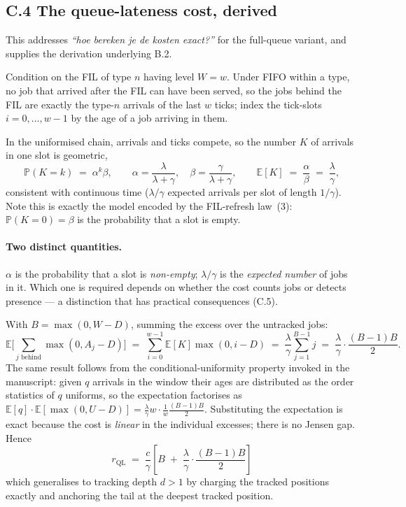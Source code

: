 \documentclass[11pt,a4paper]{article}
\newcommand{\E}{\mathbb{E}}
\newcommand{\Prob}{\mathbb{P}}
\newcommand{\comment}[1]{\textcolor{red!70!black}{\textit{``#1''}}}
\begin{document}
\subsection*{C.4 The queue-lateness cost, derived}

This addresses \comment{hoe bereken je de kosten exact?} for the full-queue
variant, and supplies the derivation underlying B.2.

Condition on the FIL of type $n$ having level $W = w$.  Under FIFO within a
type, no job that arrived after the FIL can have been served, so the jobs behind
the FIL are exactly the type-$n$ arrivals of the last $w$ ticks; index the
tick-slots $i = 0,\dots,w-1$ by the age of a job arriving in them.

In the uniformised chain, arrivals and ticks compete, so the number $K$ of
arrivals in one slot is geometric,
\[
  \Prob(K = k) \;=\; \alpha^k\beta,
  \qquad \alpha = \frac{\lambda}{\lambda+\gamma},
  \quad \beta = \frac{\gamma}{\lambda+\gamma},
  \qquad \E[K] \;=\; \frac{\alpha}{\beta} \;=\; \frac{\lambda}{\gamma},
\]
consistent with continuous time ($\lambda/\gamma$ expected arrivals per slot of
length $1/\gamma$).  Note this is exactly the model encoded by the FIL-refresh
law~(3): $\Prob(K = 0) = \beta$ is the probability that a slot is empty.

\paragraph{Two distinct quantities.}
$\alpha$ is the probability that a slot is \emph{non-empty}; $\lambda/\gamma$ is
the \emph{expected number} of jobs in it.  Which one is required depends on
whether the cost counts jobs or detects presence --- a distinction that has
practical consequences (C.5).

With $B = \max(0, W-D)$, summing the excess over the untracked jobs:
\[
  \E\Big[\sum_{j\text{ behind}} \max(0, A_j - D)\Big]
  \;=\; \sum_{i=0}^{w-1}\E[K]\max(0,i-D)
  \;=\; \frac{\lambda}{\gamma}\sum_{j=1}^{B-1} j
  \;=\; \frac{\lambda}{\gamma}\cdot\frac{(B-1)B}{2}.
\]
The same result follows from the conditional-uniformity property invoked in the
manuscript: given $q$ arrivals in the window their ages are distributed as the
order statistics of $q$ uniforms, so the expectation factorises as
$\E[q]\cdot\E[\max(0,U-D)] = \frac{\lambda}{\gamma}w \cdot \frac{1}{w}\frac{(B-1)B}{2}$.
Substituting the expectation is exact because the cost is \emph{linear} in the
individual excesses; there is no Jensen gap.  Hence
\[
  \boxed{\;r_{\text{QL}} \;=\; \frac{c}{\gamma}\left[B \;+\;
  \frac{\lambda}{\gamma}\cdot\frac{(B-1)B}{2}\right]\;}
\]
which generalises to tracking depth $d>1$ by charging the tracked positions
exactly and anchoring the tail at the deepest tracked position.
\end{document}
